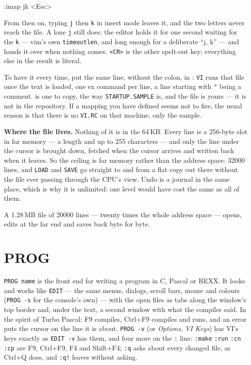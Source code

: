 \begin{type}
:imap jk <Esc>
\end{type}

\noindent From then on, typing \verb|j| then \verb|k| in insert mode
leaves it, and the two letters never reach the file. A lone \verb|j|
still does: the editor holds it for one second waiting for the
\verb|k| --- vim's own \texttt{timeoutlen}, and long enough for a
deliberate ``j, k'' --- and hands it over when nothing comes. \verb|<CR>| is the other
spelt-out key; everything else in the result is literal.

To have it every time, put the same line, without the colon, in
: \verb|VI| runs that file once the text is
loaded, one ex command per line, a line starting with \verb|"| being a
comment.  is one to copy, the way
\texttt{STARTUP.SAMPLE} is, and the file is yours --- it is not in the
repository. If a mapping you have defined seems not to fire, the usual
reason is that there is no \texttt{VI.RC} on that machine, only the
sample.

\begin{aside}
\textbf{Where the file lives.} Nothing of it is in the 64\,KB. Every line
is a 256-byte slot in far memory --- a length and up to 255 characters ---
and only the line under the cursor is brought down, fetched when the
cursor arrives and written back when it leaves. So the ceiling is far
memory rather than the address space: 32000 lines, and \verb|LOAD| and
\verb|SAVE| go straight to and from a flat copy out there without the file
ever passing through the CPU's view. Undo is a journal in the same
place, which is why it is unlimited: one level would have cost the same
as all of them.

A 1.28\,MB file of 20000 lines --- twenty times the whole address space
--- opens, edits at the far end and saves back byte for byte.
\end{aside}

\section{PROG}\label{sec:prog}
\verb|PROG name| is the front end for writing a program in C, Pascal or REXX.
It looks and works like \verb|EDIT| --- the same menus, dialogs, scroll
bars, mouse and colours (\verb|PROG -s| for the console's own) --- with the
open files as tabs along the window's top border and, under the text, a
second window with what the compiler said. In the spirit of Turbo Pascal:
F9 compiles, Ctrl+F9 compiles and runs, and an error puts the cursor on the
line it is about. \verb|PROG -v| (or \emph{Options}, \emph{VI Keys}) has
VI's keys exactly as \verb|EDIT -v| has them, and four more on the
\verb|:| line: \verb|:make| \verb|:run| \verb|:cn| \verb|:cp| are F9,
Ctrl+F9, F4 and Shift+F4; \verb|:q| asks about every changed file, as
Ctrl+Q does, and \verb|:q!| leaves without asking.

